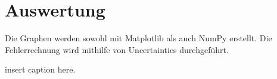\section{Auswertung}
\label{sec:Auswertung}

Die Graphen werden sowohl mit Matplotlib \cite{matplotlib} als auch NumPy \cite{numpy} erstellt. Die Fehlerrechnung wird mithilfe von Uncertainties \cite{uncertainties} durchgeführt.

\begin{table}
	\centering
	\caption{insert caption here.}
	\label{tab:tab}
\end{table}
